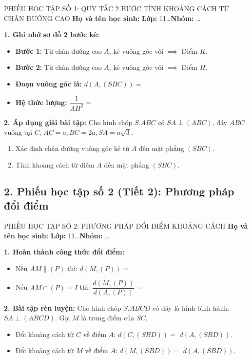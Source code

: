 \documentclass[12pt, a4paper]{article}
\begin{document}
\begin{itemize}[leftmargin=1.2cm]
\begin{pedabox}{PHIẾU HỌC TẬP SỐ 1: QUY TẮC 2 BƯỚC TÍNH KHOẢNG CÁCH TỪ CHÂN ĐƯỜNG CAO}
    \textbf{Họ và tên học sinh:} \dotfill \textbf{Lớp:} 11\dots \textbf{Nhóm:} \dots
    
    \textbf{1. Ghi nhớ sơ đồ 2 bước kẻ:}
    \begin{itemize}[leftmargin=0.6cm]
        \item \textbf{Bước 1:} Từ chân đường cao $A$, kẻ vuông góc với \dotfill $\implies$ Điểm $K$.
        \item \textbf{Bước 2:} Từ chân đường cao $A$, kẻ vuông góc với \dotfill $\implies$ Điểm $H$.
        \item \textbf{Đoạn vuông góc là:} $d(A, (SBC)) = $ \dotfill
        \item \textbf{Hệ thức lượng:} $\dfrac{1}{AH^2} = $ \dotfill
    \end{itemize}

    \textbf{2. Áp dụng giải bài tập:}
    Cho hình chóp $S.ABC$ có $SA \perp (ABC)$, đáy $ABC$ vuông tại $C$, $AC = a, BC = 2a, SA = a\sqrt{3}$.
    \begin{enumerate}
        \item Xác định chân đường vuông góc kẻ từ $A$ đến mặt phẳng $(SBC)$.
        \item Tính khoảng cách từ điểm $A$ đến mặt phẳng $(SBC)$.
    \end{enumerate}
\end{pedabox}

\subsection*{2. Phiếu học tập số 2 (Tiết 2): Phương pháp đổi điểm}

\begin{pedabox}{PHIẾU HỌC TẬP SỐ 2: PHƯƠNG PHÁP ĐỔI ĐIỂM KHOẢNG CÁCH}
    \textbf{Họ và tên học sinh:} \dotfill \textbf{Lớp:} 11\dots \textbf{Nhóm:} \dots

    \textbf{1. Hoàn thành công thức đổi điểm:}
    \begin{itemize}[leftmargin=0.6cm]
        \item Nếu $AM \parallel (P)$ thì: $d(M, (P)) = $ \dotfill
        \item Nếu $AM \cap (P) = I$ thì: $\dfrac{d(M, (P))}{d(A, (P))} = $ \dotfill
    \end{itemize}

    \textbf{2. Bài tập rèn luyện:}
    Cho hình chóp $S.ABCD$ có đáy là hình bình hành. $SA \perp (ABCD)$. Gọi $M$ là trung điểm của $SC$.
    \begin{itemize}[leftmargin=0.6cm]
        \item Đổi khoảng cách từ $C$ về điểm $A$: $d(C, (SBD)) = $ \dotfill $d(A, (SBD))$.
        \item Đổi khoảng cách từ $M$ về điểm $A$: $d(M, (SBD)) = $ \dotfill $d(A, (SBD))$.
    \end{itemize}
\end{pedabox}


\end{itemize}
\end{document}
